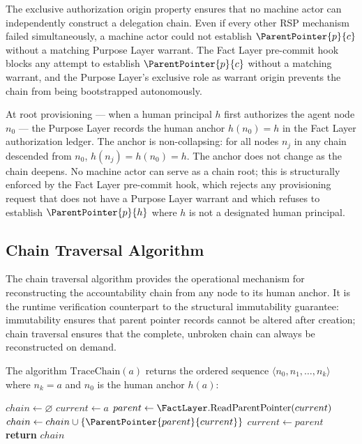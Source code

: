 The exclusive authorization origin property ensures that no machine actor can independently construct a delegation chain. Even if every other RSP mechanism failed simultaneously, a machine actor could not establish $\ParentPointer{p}{c}$ without a matching Purpose Layer warrant. The Fact Layer pre-commit hook blocks any attempt to establish $\ParentPointer{p}{c}$ without a matching warrant, and the Purpose Layer's exclusive role as warrant origin prevents the chain from being bootstrapped autonomously.

At root provisioning --- when a human principal $h$ first authorizes the agent node $n_0$ --- the Purpose Layer records the human anchor $h(n_0) = h$ in the Fact Layer authorization ledger. The anchor is non-collapsing: for all nodes $n_j$ in any chain descended from $n_0$, $h(n_j) = h(n_0) = h$. The anchor does not change as the chain deepens. No machine actor can serve as a chain root; this is structurally enforced by the Fact Layer pre-commit hook, which rejects any provisioning request that does not have a Purpose Layer warrant and which refuses to establish $\ParentPointer{p}{h}$ where $h$ is not a designated human principal.

\subsection{Chain Traversal Algorithm}
\label{sec:rs-chain-traversal-algorithm}

The chain traversal algorithm provides the operational mechanism for reconstructing the accountability chain from any node to its human anchor. It is the runtime verification counterpart to the structural immutability guarantee: immutability ensures that parent pointer records cannot be altered after creation; chain traversal ensures that the complete, unbroken chain can always be reconstructed on demand.

\begin{dfn}
\label{dfn:rs-chain-traversal}
The algorithm $\mathrm{TraceChain}(a)$ returns the ordered sequence $\langle n_0, n_1, \ldots, n_k \rangle$ where $n_k = a$ and $n_0$ is the human anchor $h(a)$:

\begin{algorithmic}
\STATE $chain \leftarrow \varnothing$
\STATE $current \leftarrow a$
    \STATE $parent \leftarrow \FactLayer.\text{ReadParentPointer}(current)$
    \STATE $chain \leftarrow chain \cup \{\ParentPointer{parent}{current}\}$
    \STATE $current \leftarrow parent$
\ENDWHILE
\STATE \textbf{return} $chain$
\end{algorithmic}
\end{dfn}

